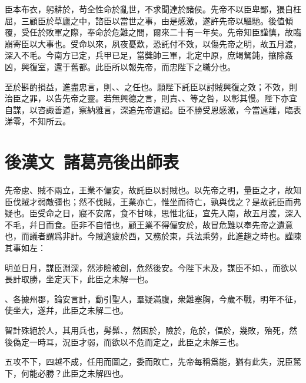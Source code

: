 臣本布衣，躬耕於，苟全性命於亂世，不求聞達於諸侯。先帝不以臣卑鄙，猥自枉屈，三顧臣於草廬之中，諮臣以當世之事，由是感激，遂許先帝以驅馳。後值傾覆，受任於敗軍之際，奉命於危難之間，爾來二十有一年矣。先帝知臣謹慎，故臨崩寄臣以大事也。受命以來，夙夜憂歎，恐託付不效，以傷先帝之明，故五月渡，深入不毛。今南方已定，兵甲已足，當獎帥三軍，北定中原，庶竭駑鈍，攘除姦凶，興復室，還于舊都。此臣所以報先帝，而忠陛下之職分也。

至於斟酌損益，進盡忠言，則、、之任也。願陛下託臣以討賊興復之效；不效，則治臣之罪，以告先帝之靈。若無興德之言，則責、、等之咎，以彰其慢。陛下亦宜自謀，以咨諏善道，察納雅言，深追先帝遺詔。臣不勝受恩感激，今當遠離，臨表涕零，不知所云。

\theendnotes

\section[諸葛亮後出師表\quad{\small 後漢文}]{{\normalsize 後漢文\ 諸葛亮}\quad 後出師表}
先帝慮、賊不兩立，王業不偏安，故託臣以討賊也。以先帝之明，量臣之才，故知臣伐賊才弱敵彊也；然不伐賊，王業亦亡，惟坐而待亡，孰與伐之？是故託臣而弗疑也。臣受命之日，寢不安席，食不甘味，思惟北征，宜先入南，故五月渡，深入不毛，幷日而食。臣非不自惜也，顧王業不得偏安於，故冒危難以奉先帝之遺意也，而議者謂爲非計。今賊適疲於西，又務於東，兵法乘勞，此進趨之時也。謹陳其事如左：

明並日月，謀臣淵深，然涉險被創，危然後安。今陛下未及，謀臣不如、，而欲以長計取勝，坐定天下，此臣之未解一也。

、各據州郡，論安言計，動引聖人，羣疑滿腹，衆難塞胸，今歲不戰，明年不征，使坐大，遂幷，此臣之未解二也。

智計殊絕於人，其用兵也，髣髴、，然困於，險於，危於，偪於，幾敗，殆死，然後偽定一時耳，況臣才弱，而欲以不危而定之，此臣之未解三也。

五攻不下，四越不成，任用而圖之，委而敗亡，先帝每稱爲能，猶有此失，況臣駑下，何能必勝？此臣之未解四也。

